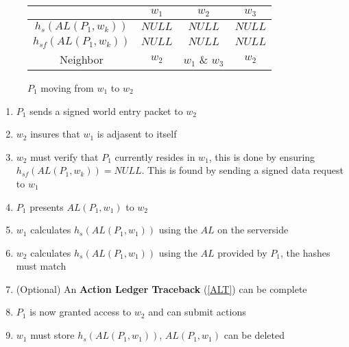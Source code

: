 \documentclass[runningheads,a4paper]{llncs}
\begin{document}
\begin{figure}
\caption{$P_1$ moving from $w_1$ to $w_2$}
\label{w1tow2}
\begin{center}
\end{center}
\begin{center}
\begin{tabular}{ c|c c c }
& $w_1$ & $w_2$ & $w_3$ \\
\hline 
$h_s(AL(P_1,w_k))$ & $NULL$ & $NULL$ & $NULL$ \\ 
$h_{sf}(AL(P_1,w_k))$ & $NULL$ & $NULL$ & $NULL$ \\ 
Neighbor & $w_2$ & $w_1$ \& $w_3$ & $w_2$\\
\end{tabular}
\end{center}
\end{figure}

\begin{enumerate}
\item $P_1$ sends a signed world entry packet to $w_2$
\item $w_2$ insures that $w_1$ is adjasent to itself
\item $w_2$ must verify that $P_1$ currently resides in $w_1$, this is done by ensuring $h_{sf}(AL(P_1,w_k)) = NULL$. This is found by sending a signed data request to $w_1$ 
\item $P_1$ presents $AL(P_1,w_1)$ to $w_2$
\item $w_1$ calculates $h_s(AL(P_1,w_1))$ using the $AL$ on the serverside
\item $w_2$ calculates $h_s(AL(P_1,w_1))$ using the $AL$ provided by $P_1$, the hashes must match
\item (Optional) An \textbf{Action Ledger Traceback} (\ref{ALT}) can be complete
\item $P_1$ is now granted access to $w_2$ and can submit actions
\item $w_1$ must store $h_s(AL(P_1,w_1))$, $AL(P_1,w_1)$ can be deleted
\end{enumerate}
\end{document}
